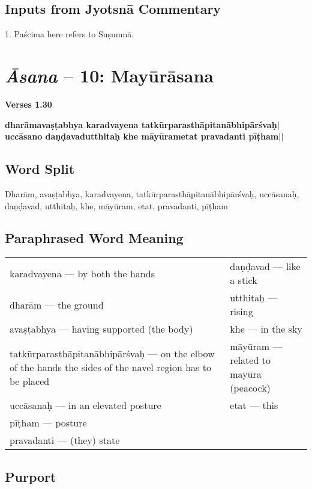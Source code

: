 \subsection*{Inputs from Jyotsnā Commentary}
\vspace{-10pt}

1. Paścima here refers to Suṣumnā.
\newpage

\section*{\textit{Āsana} -- 10: Mayūrāsana}


\noindent 
\textbf{Verses 1.30}

\begin{shloka}
\textbf{dharāmavaṣṭabhya karadvayena tatkūrparasthāpitanābhipārśvaḥ|}\\
\textbf{uccāsano daṇḍavadutthitaḥ khe māyūrametat pravadanti pīṭham||}
\end{shloka}

\subsection*{Word Split}

Dharām, avaṣṭabhya, karadvayena, tatkūrparasthāpitanābhipārśvaḥ, uccāsanaḥ, daṇḍavad, utthitaḥ, khe, māyūram, etat, pravadanti, pīṭham

\subsection*{Paraphrased Word Meaning}

\begin{longtable}{>{\noindent\raggedright}p{5cm}>{\noindent\raggedright}p{5cm}}
karadvayena --- by both the hands &  daṇḍavad --- like  a stick\tabularnewline
dharām --- the ground  & utthitaḥ --- rising\tabularnewline
avaṣṭabhya --- having supported (the body) & khe --- in the sky\tabularnewline
tatkūrparasthāpitanābhipārśvaḥ --- on the elbow of the hands the sides of the navel  region has to be placed & māyūram --- related to  mayūra (peacock)\tabularnewline
uccāsanaḥ --- in an elevated posture & etat --- this\tabularnewline
pīṭham --- posture  & \tabularnewline
pravadanti --- (they) state & 
\end{longtable}

\subsection*{Purport}

